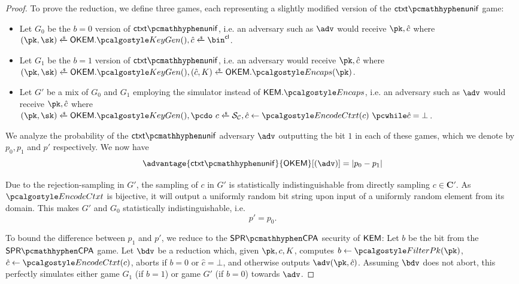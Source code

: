 \begin{proof}
    To prove the reduction, we define three games, each representing a slightly modified version of the $\ctxtunif$ game:
    \begin{itemize}
        \item Let $G_0$ be the $b=0$ version of $\ctxtunif$, i.e. an adversary such as $\adv$ would receive $\pk, \hat c$ where 
        $(\pk,\sk) \getsr \OKEM.\kgen(), \hat c \getsr \bin^\obfctxtlen$.
        \item Let $G_1$ be the $b=1$ version of $\ctxtunif$, i.e. an adversary would receive $\pk, \hat c$ where\\
        $(\pk,\sk) \getsr \OKEM.\kgen(), (\hat c, K) \getsr \OKEM.\encaps(\pk)$.
        \item Let $G'$ be a mix of $G_0$ and $G_1$ employing the simulator instead of $\KEM.\encaps$, i.e. an adversary such as $\adv$ would receive $\pk, \hat c$ where\\
        $(\pk,\sk) \getsr \OKEM.\kgen(), \pcdo\ c \getsr \simulunif, \hat c \gets \encodectxt(c)\ \pcwhile \hat c = \bot$.
    \end{itemize}

    We analyze the probability of the $\ctxtunif$ adversary $\adv$ outputting the bit $1$ in each of these games, which we denote by $p_0, p_1$ and $p'$ respectively.
    We now have
    \[
        \advantage{\ctxtunif}{\OKEM}[(\adv)] = \left| p_0 - p_1 \right|
    \]

    Due to the rejection-sampling in $G'$, the sampling of $c$ in $G'$ is statistically indistinguishable from directly sampling $c \in \mathbf{C}'$. As $\encodectxt$ is bijective, it will output a uniformly random bit string upon input of a uniformly random element from its domain. This makes $G'$ and $G_0$ statistically indistinguishable, i.e.
    \[ p' = p_0. \]

    To bound the difference between $p_1$ and $p'$, we reduce to the $\sprcpa$ security of $\mathsf{KEM}$:
    Let $b$ be the bit from the $\sprcpa$ game. Let $\bdv$ be a reduction which, given $\pk, c, K$, computes $b \gets \filterpk(\pk)$, $\hat c \gets \encodectxt(c)$, aborts if $b=0$ or $\hat c = \bot$, and otherwise outputs $\adv(\pk, \hat c)$.
    Assuming $\bdv$ does not abort, this perfectly simulates either game $G_1$ (if $b=1$) or game $G'$ (if $b=0$) towards $\adv$.
    

\end{proof}
